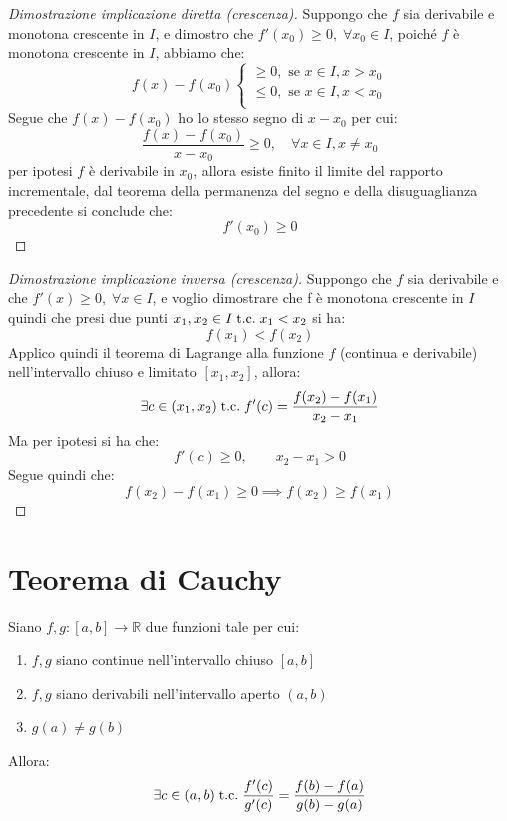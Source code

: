 \documentclass[a4paper,12pt,openright]{book}
\begin{document}
	\begin{proof}[Dimostrazione implicazione diretta (crescenza)]
		Suppongo che $f$ sia derivabile e monotona crescente in $I$, e dimostro che $f'(x_0) \geq 0, \; \forall x_0 \in I$, poiché $f$ è monotona crescente in $I$, abbiamo che:
		\[f(x) - f(x_0) \begin{cases}
			\geq 0, \text{ se } x \in I, x > x_0 \\
			\leq 0, \text{ se } x \in I, x < x_0 \\
		\end{cases}\]
		Segue che $f(x) - f(x_0)$ ho lo stesso segno di $x - x_0$ per cui:
		\[\frac{f(x) - f(x_0)}{x - x_0} \geq 0, \quad \forall x \in I, x \not = x_0\]
		per ipotesi $f$ è derivabile in $x_0$, allora esiste finito il limite del rapporto incrementale, dal teorema della permanenza del segno e della disuguaglianza precedente si conclude che:
		\[f'(x_0) \geq 0\]
	\end{proof}
	\begin{proof}[Dimostrazione implicazione inversa (crescenza)]
		Suppongo che $f$ sia derivabile e che $f'(x) \geq 0, \; \forall x \in I$, e voglio dimostrare che f è monotona crescente in $I$ quindi che presi due punti $x_1, x_2 \in I \;\text{t.c.}\; x_1 < x_2$ si ha:
		\[f(x_1) < f(x_2)\]
		Applico quindi il teorema di Lagrange alla funzione $f$ (continua e derivabile) nell'intervallo chiuso e limitato $[x_1, x_2]$, allora:
		\[\exists c \in (x_1, x_2) \;\text{t.c.}\; f'(c) = \frac{f(x_2) - f(x_1)}{x_2 - x_1}\]
		Ma per ipotesi si ha che:
		\[f'(c) \geq 0, \quad \quad x_2 - x_1 > 0\]
		Segue quindi che:
		\[f(x_2) - f(x_1) \geq 0 \implies f(x_2) \geq f(x_1)\]
	\end{proof}
	
	
	\newpage
	
	\section{Teorema di Cauchy}
	Siano $f, g: [a, b] \longrightarrow \mathbb{R}$ due funzioni tale per cui:
	
	\begin{enumerate}[label=\roman*)]
		\item $f, g$ siano continue nell'intervallo chiuso $[a, b]$
		\item $f, g$ siano derivabili nell'intervallo aperto $(a, b)$
		\item $g(a) \not = g(b)$
	\end{enumerate}
	Allora:
	\[\exists c \in (a, b) \;\text{t.c.}\; \frac{f'(c)}{g'(c)} = \frac{f(b) - f(a)}{g(b) - g(a)}\]
	
\end{document}
